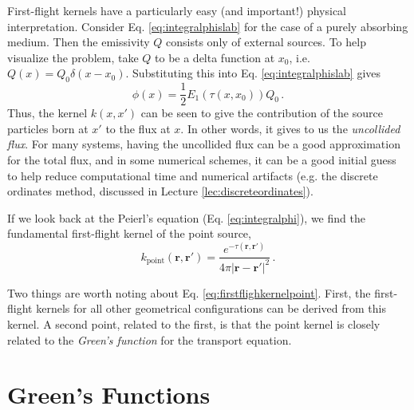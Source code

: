 First-flight kernels have a particularly easy (and important!) physical interpretation. Consider Eq. \ref{eq:integralphislab} for the case of a purely absorbing medium.  Then the emissivity $Q$ consists only of external sources.  To help visualize the problem, take $Q$ to be a delta function at $x_0$, i.e. $Q(x) = Q_0 \delta(x-x_0)$.  Substituting this into Eq. \ref{eq:integralphislab} gives
\begin{equation}
 \phi(x) = \frac{1}{2} E_1(\tau(x,x_0)) Q_0 \, . 
\end{equation}
Thus, the kernel $k(x,x')$ can be seen to give the contribution of the source particles born at $x'$ to the flux at $x$.  In other words, it gives to us the \textit{uncollided flux}.  For many systems, having the uncollided flux can be a good approximation for the total flux, and in some numerical schemes, it can be a good initial guess to help reduce computational time and numerical artifacts (e.g. the discrete ordinates method, discussed in Lecture \ref{lec:discreteordinates}).

If we look back at the Peierl's equation (Eq. \ref{eq:integralphi}), we find the fundamental first-flight kernel of the point source, 
\begin{equation}
 k_{\text{point}}(\mathbf{r},\mathbf{r}') = \frac{e^{-\tau(\mathbf{r},\mathbf{r}')}}{4\pi|\mathbf{r}-\mathbf{r}'|^2} \, .
 \label{eq:firstflighkernelpoint}
\end{equation}

Two things are worth noting about Eq. \ref{eq:firstflighkernelpoint}.  First, the first-flight kernels for all other geometrical configurations can be derived from this kernel.  A second point, related to the first, is that the point kernel is closely related to the \textit{Green's function} for the transport equation.  

\section*{Green's Functions}


